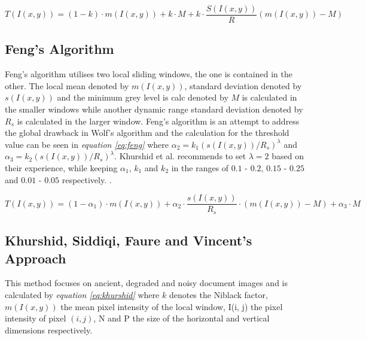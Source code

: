 \documentclass[11pt]{article}
\begin{document}
				\begin{large}
				\begin{equation} \label{eq:wolf}
					T(I(x, y)) = (1 - k) \cdot m(I(x, y)) + k \cdot M + k \cdot \frac{S(I(x, y))}{R}(m(I(x, y)) - M)
				\end{equation}
				\end{large}

  		\subsection{Feng's Algorithm}%
  			Feng's algorithm utilises two local sliding windows, the one is contained in the other. The local mean denoted by $m(I(x, y))$, standard deviation denoted by $s(I(x, y))$ and the minimum grey level is calc denoted by $M$ is calculated in the smaller windows while another dynamic range standard deviation denoted by $R_s$ is calculated in the larger window. Feng's algorithm is an attempt to address the global drawback in Wolf's algorithm and the calculation for the threshold value can be seen in \textit{equation \ref{eq:feng}} where $\alpha_2 = k_1(s(I(x, y))/R_s)^\lambda$ and $\alpha_3 = k_2(s(I(x, y))/R_s)^\lambda$. Khurshid et al. recommends to set $\lambda=2$ based on their experience, while keeping $\alpha_1$, $k_1$ and $k_2$ in the ranges of $0.1$ - $0.2$, $0.15$ - $0.25$ and $0.01$ - $0.05$ respectively. \cite{khurshid2009comparison}.

				\begin{large}
				\begin{equation} \label{eq:feng}
					T(I(x, y)) = (1 - \alpha_1) \cdot m(I(x, y)) + \alpha_2 \cdot \frac{s(I(x, y))}{R_s} \cdot (m(I(x, y)) - M) + \alpha_3  \cdot M
				\end{equation}
				\end{large}

  		\subsection{Khurshid, Siddiqi, Faure and Vincent's Approach}%
  			This method focuses on ancient, degraded and noisy document images and is calculated by \textit{equation \ref{eq:khurshid}} where $k$ denotes the Niblack factor, $m(I(x, y))$ the mean pixel intensity of the local window, I(i, j) the pixel intensity of pixel $(i, j)$, N and P the size of the horizontal and vertical dimensions respectively.\\
\end{document}
